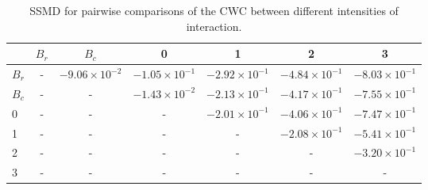 \begin{table}
\centering
\caption{SSMD for pairwise comparisons of the CWC between different intensities of interaction.}
\label{tab:ssmd_coherence}
\begin{tabular}{lcccccc}
\toprule
 & $B_r$ & $B_c$ & 0 & 1 & 2 & 3 \\
\midrule
$B_r$ & - & $-9.06 \times 10^{-2}$ & $-1.05 \times 10^{-1}$ & $-2.92 \times 10^{-1}$ & $-4.84 \times 10^{-1}$ & $-8.03 \times 10^{-1}$ \\
$B_c$ & - & - & $-1.43 \times 10^{-2}$ & $-2.13 \times 10^{-1}$ & $-4.17 \times 10^{-1}$ & $-7.55 \times 10^{-1}$ \\
0 & - & - & - & $-2.01 \times 10^{-1}$ & $-4.06 \times 10^{-1}$ & $-7.47 \times 10^{-1}$ \\
1 & - & - & - & - & $-2.08 \times 10^{-1}$ & $-5.41 \times 10^{-1}$ \\
2 & - & - & - & - & - & $-3.20 \times 10^{-1}$ \\
3 & - & - & - & - & - & - \\
\bottomrule
\end{tabular}
\end{table}
